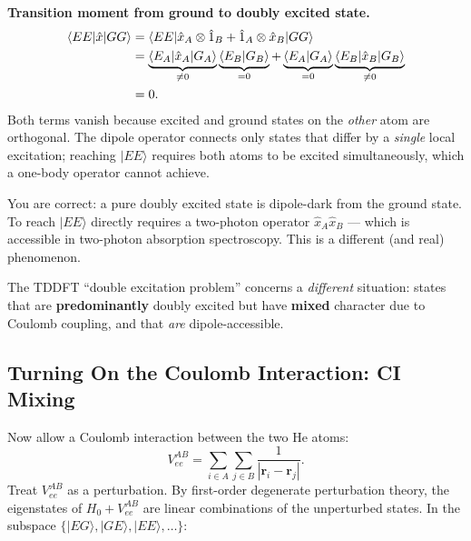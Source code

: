 \documentclass[12pt,letterpaper]{article}
\newcommand{\braket}[2]{\langle #1 \vert #2 \rangle}
\newcommand{\mel}[3]{\langle #1 \vert #2 \vert #3 \rangle}
\theoremstyle{definition}
\begin{document}
\begin{derivbox}
\textbf{Transition moment from ground to doubly excited state.}
\begin{align}
  \mel{EE}{\hat{x}}{GG}
  &= \mel{EE}{\hat{x}_A\otimes\hat{1}_B + \hat{1}_A\otimes\hat{x}_B}{GG}
  \notag\\
  &= \underbrace{\mel{E_A}{\hat{x}_A}{G_A}}_{\neq 0}
     \underbrace{\braket{E_B}{G_B}}_{=0}
   + \underbrace{\braket{E_A}{G_A}}_{=0}
     \underbrace{\mel{E_B}{\hat{x}_B}{G_B}}_{\neq 0}
  \notag\\
  &= 0.
  \label{eq:double_forbidden}
\end{align}
Both terms vanish because excited and ground states on the
\emph{other} atom are orthogonal.  The dipole operator connects only
states that differ by a \emph{single} local excitation; reaching $|EE\rangle$
requires both atoms to be excited simultaneously, which a one-body
operator cannot achieve.
\end{derivbox}

\begin{insight}
You are correct: a pure doubly excited state is dipole-dark from the
ground state.  To reach $|EE\rangle$ directly requires a two-photon
operator $\hat{x}_A\hat{x}_B$ --- which is accessible in two-photon
absorption spectroscopy.  This is a different (and real) phenomenon.

The TDDFT ``double excitation problem'' concerns a \emph{different}
situation: states that are \textbf{predominantly} doubly excited but
have \textbf{mixed} character due to Coulomb coupling, and that
\emph{are} dipole-accessible.
\end{insight}

\subsection{Turning On the Coulomb Interaction: CI Mixing}

Now allow a Coulomb interaction between the two He atoms:
\begin{equation}
  V_{ee}^{AB} = \sum_{i\in A}\sum_{j\in B} \frac{1}{|\bm{r}_i - \bm{r}_j|}.
  \label{eq:vee}
\end{equation}
Treat $V_{ee}^{AB}$ as a perturbation.  By first-order degenerate
perturbation theory, the eigenstates of $H_0 + V_{ee}^{AB}$ are
linear combinations of the unperturbed states.  In the subspace
$\{|EG\rangle, |GE\rangle, |EE\rangle, \ldots\}$:
\end{document}
